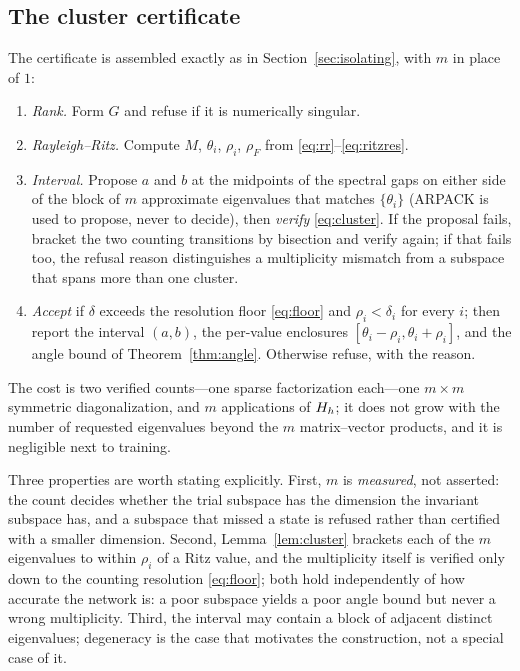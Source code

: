 \subsection{The cluster certificate}
\label{sec:cluster-alg}

The certificate is assembled exactly as in Section~\ref{sec:isolating}, with
$m$ in place of $1$:

\begin{enumerate}
\item \emph{Rank.} Form $G$ and refuse if it is numerically singular.
\item \emph{Rayleigh--Ritz.} Compute $M$, $\theta_i$, $\rho_i$, $\rho_F$
  from \eqref{eq:rr}--\eqref{eq:ritzres}.
\item \emph{Interval.} Propose $a$ and $b$ at the midpoints of the spectral
  gaps on either side of the block of $m$ approximate eigenvalues that
  matches $\{\theta_i\}$ (ARPACK is used to propose, never to decide), then
  \emph{verify} \eqref{eq:cluster}. If the proposal fails, bracket the two
  counting transitions by bisection and verify again; if that fails too, the
  refusal reason distinguishes a multiplicity mismatch from a subspace that
  spans more than one cluster.
\item \emph{Accept} if $\delta$ exceeds the resolution floor \eqref{eq:floor}
  and $\rho_i<\delta_i$ for every $i$; then report the interval $(a,b)$, the
  per-value enclosures $[\theta_i-\rho_i,\theta_i+\rho_i]$, and the angle
  bound of Theorem~\ref{thm:angle}. Otherwise refuse, with the reason.
\end{enumerate}

The cost is two verified counts---one sparse factorization each---one
$m\times m$ symmetric diagonalization, and $m$ applications of $H_h$; it does
not grow with the number of requested eigenvalues beyond the $m$ matrix--vector
products, and it is negligible next to training.

Three properties are worth stating explicitly. First, $m$ is \emph{measured},
not asserted: the count decides whether the trial subspace has the dimension
the invariant subspace has, and a subspace that missed a state is refused
rather than certified with a smaller dimension. Second, Lemma~\ref{lem:cluster}
brackets each of the $m$ eigenvalues to within $\rho_i$ of a Ritz value, and the
multiplicity itself is verified only down to the counting resolution
\eqref{eq:floor}; both hold independently of how accurate the network is: a
poor subspace yields a poor angle bound but never a wrong multiplicity. Third, the interval may
contain a block of adjacent distinct eigenvalues; degeneracy is the case that
motivates the construction, not a special case of it.

